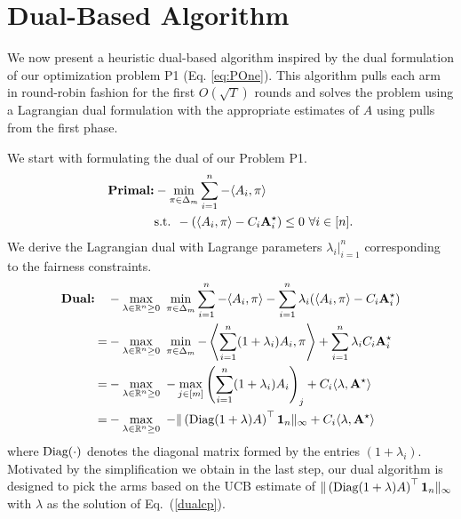 \section{Dual-Based Algorithm}\label{sec:dual}
We now present a heuristic dual-based algorithm inspired by the dual formulation of our optimization problem P1 (Eq. \ref{eq:POne}). This algorithm pulls each arm in  round-robin fashion for the first $O(\sqrt{T})$ rounds  and solves the problem using a Lagrangian dual formulation with the appropriate  estimates of $A$ using pulls from the  first phase. 


We start  with formulating the dual of our Problem P1. %
\begin{align}
    \textup{\textbf{Primal:}}& -\min_{\pi\in\Delta_m} \sum_{i=1}^n -\langle A_i, \pi\rangle \nonumber
    \\
    &\textup{s.t. }-(\langle A_i, \pi\rangle - C_i\Amax_i)\leq 0 \ \forall i\in[n].
\end{align}
We derive the Lagrangian dual with Lagrange parameters $\lambda_i|_{i=1}^n$ corresponding to the fairness constraints.
\begin{align}
    \textup{\textbf{Dual:}}\quad &-\max_{\lambda \in \mathbb{R}^n \geq 0}\ \min_{\pi\in \Delta_m} \sum_{i=1}^n-\langle A_i, \pi\rangle - \sum_{i=1}^n \lambda_i(\langle A_i, \pi\rangle - C_i\Amax_i) \nonumber\\
    =& -\max_{\lambda \in \mathbb{R}^n \geq 0}\ \min_{\pi\in \Delta_m} -\left\langle\sum_{i=1}^n(1 +\lambda_i)A_i, \pi\right\rangle + \sum_{i=1}^n \lambda_i C_i\Amax_i \nonumber\\
    =& -\max_{\lambda \in \mathbb{R}^n \geq 0} \ -\max_{j\in[m]}\left(\sum_{i=1}^n(1+\lambda_i)A_i\right)_j + C_i\langle\lambda, \Amax \rangle\nonumber\\
    =&-\max_{\lambda \in \mathbb{R}^n \geq 0} \ - \|\left(\textup{Diag}(1+\lambda)A\right)^\top \mathbf{1}_n\|_\infty + C_i\langle\lambda, \Amax \rangle \label{dualcp}
\end{align}
where $\textup{Diag}(\cdot)$ denotes the diagonal matrix formed by the entries $(1+\lambda_i)$.
Motivated by the simplification we obtain in the last step, our dual algorithm is designed to pick the arms based on the UCB estimate of $\|\left(\textup{Diag}(1+\lambda)A\right)^\top \mathbf{1}_n\|_\infty$ with $\lambda$ as the solution of Eq.~(\ref{dualcp}).

